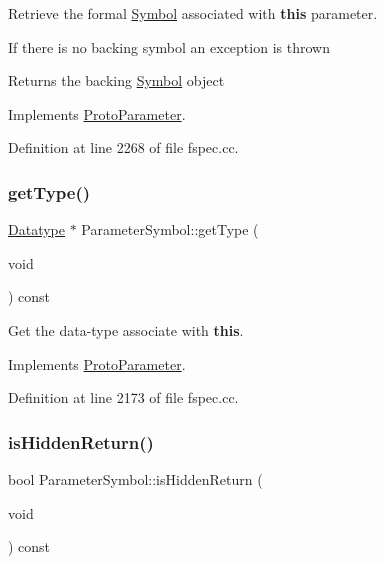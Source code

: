 Retrieve the formal \mbox{\hyperlink{class_symbol}{Symbol}} associated with {\bfseries{this}} parameter. 

If there is no backing symbol an exception is thrown \begin{DoxyReturn}{Returns}
the backing \mbox{\hyperlink{class_symbol}{Symbol}} object 
\end{DoxyReturn}


Implements \mbox{\hyperlink{class_proto_parameter_afb4a7192eb2e8449b47d85073b3d82e6}{Proto\+Parameter}}.



Definition at line 2268 of file fspec.\+cc.

\mbox{\label{class_parameter_symbol_aec9aa765fcdb4e21f4fd223573e802b3}} 
\subsubsection{\texorpdfstring{getType()}{getType()}}
{\footnotesize\ttfamily \mbox{\hyperlink{class_datatype}{Datatype}} $\ast$ Parameter\+Symbol\+::get\+Type (\begin{DoxyParamCaption}\item[{void}]{ }\end{DoxyParamCaption}) const\hspace{0.3cm}{\ttfamily [virtual]}}



Get the data-\/type associate with {\bfseries{this}}. 



Implements \mbox{\hyperlink{class_proto_parameter_a05bfe5b4fe563c1e4e93bf2648239061}{Proto\+Parameter}}.



Definition at line 2173 of file fspec.\+cc.

\mbox{\label{class_parameter_symbol_ac05ae5af47313c5cebff093434c68a97}} 
\subsubsection{\texorpdfstring{isHiddenReturn()}{isHiddenReturn()}}
{\footnotesize\ttfamily bool Parameter\+Symbol\+::is\+Hidden\+Return (\begin{DoxyParamCaption}\item[{void}]{ }\end{DoxyParamCaption}) const\hspace{0.3cm}{\ttfamily [virtual]}}



